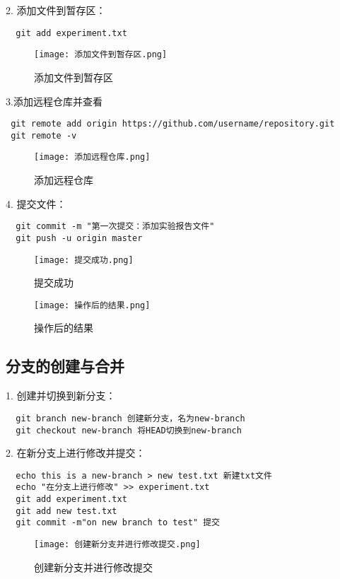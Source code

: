 \documentclass[a4paper, 12pt]{article}
\begin{document}
  2. 添加文件到暂存区：
  \begin{verbatim}
  git add experiment.txt
  \end{verbatim}

    \begin{figure}[H]
  \centering
 \texttt{[image: 添加文件到暂存区.png]}
  \caption{添加文件到暂存区}
   \end{figure}

  3.添加远程仓库并查看
   \begin{verbatim}
 git remote add origin https://github.com/username/repository.git
 git remote -v
   \end{verbatim}

    \begin{figure}[H]
  \centering
 \texttt{[image: 添加远程仓库.png]}
  \caption{添加远程仓库}
   \end{figure}
   
  4. 提交文件：
  \begin{verbatim}
  git commit -m "第一次提交：添加实验报告文件"
  git push -u origin master
  \end{verbatim}

      \begin{figure}[H]
  \centering
 \texttt{[image: 提交成功.png]}
  \caption{提交成功}
   \end{figure}

       \begin{figure}[H]
  \centering
 \texttt{[image: 操作后的结果.png]}
  \caption{操作后的结果}
   \end{figure}

  \subsection{分支的创建与合并}
  1. 创建并切换到新分支：
  \begin{verbatim}
  git branch new-branch 创建新分支，名为new-branch
  git checkout new-branch 将HEAD切换到new-branch
  \end{verbatim}

  2. 在新分支上进行修改并提交：
  \begin{verbatim}
  echo this is a new-branch > new test.txt 新建txt文件
  echo "在分支上进行修改" >> experiment.txt
  git add experiment.txt
  git add new test.txt
  git commit -m"on new branch to test" 提交
  \end{verbatim}

    \begin{figure}[H]
  \centering
 \texttt{[image: 创建新分支并进行修改提交.png]}
  \caption{创建新分支并进行修改提交}
   \end{figure}
\end{document}
